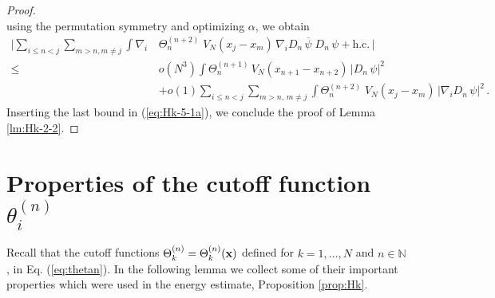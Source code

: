\documentclass[11pt]{article}
\newcommand{\bx}{{\bf x}}
\newcommand{\bN}{{\mathbb N}}
\begin{document}
\begin{proof}
\begin{equation}
\end{equation}
using the permutation symmetry and optimizing $\alpha$, we obtain
\begin{equation}
\begin{split}
\Big|\sum_{i\leq n < j} \sum_{m>n, m \neq j} \int \nabla_i \,
&\Theta^{(n+2)}_n \; V_N (x_j -x_m)\, \nabla_i D_n \,
\overline{\psi} \; D_n \, \psi +\text{h.c.} \, \Big| \\ \leq \;&
o(N^3) \int
\Theta^{(n+1)}_n \, V_N (x_{n+1} -x_{n+2})\, |D_n \, \psi|^2 \\
&+ o(1) \sum_{i\leq n < j} \sum_{m >n, \, m \neq j} \int
\Theta^{(n+2)}_n \; V_N (x_j -x_m)\, |\nabla_i D_n \,\psi|^2\,.
\end{split}
\end{equation}
Inserting the last bound in (\ref{eq:Hk-5-1a}), we conclude the
proof of Lemma \ref{lm:Hk-2-2}.
\end{proof}




\appendix



\section{Properties of the cutoff function $\theta_i^{(n)}$}
\setcounter{equation}{0}

Recall that the cutoff functions
$\Theta_k^{(n)}=\Theta_k^{(n)}(\bx)$ defined for $k=1,\dots,N$ and
$n \in \bN$, in Eq. (\ref{eq:thetan}). In the following lemma we
collect some of their important properties which were used in the
energy estimate, Proposition \ref{prop:Hk}.
\end{document}
